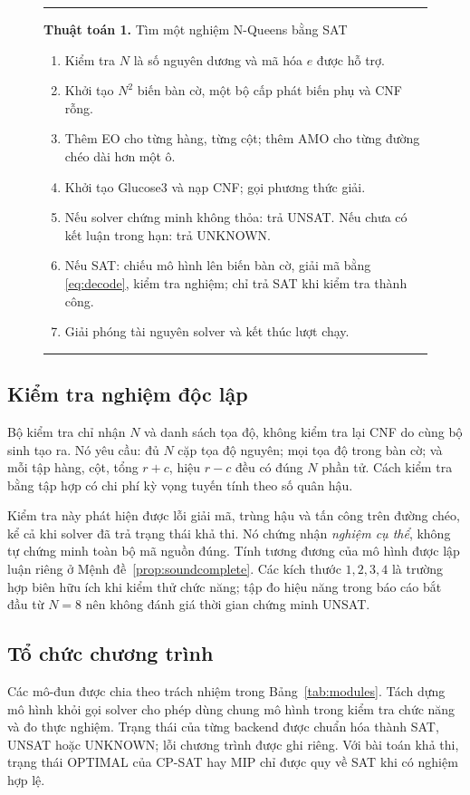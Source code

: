 \documentclass[a4paper,fleqn]{cas-sc}
\newcounter{algorithm}
\begin{document}
\begin{figure}[htbp]
\label{alg:solver}
\centering
\begin{minipage}{0.96\linewidth}
\hrule\vspace{5pt}
\textbf{Thuật toán 1.} Tìm một nghiệm N-Queens bằng SAT
\begin{enumerate}
\item Kiểm tra $N$ là số nguyên dương và mã hóa $e$ được hỗ trợ.
\item Khởi tạo $N^2$ biến bàn cờ, một bộ cấp phát biến phụ và CNF rỗng.
\item Thêm EO cho từng hàng, từng cột; thêm AMO cho từng đường chéo dài hơn một ô.
\item Khởi tạo Glucose3 và nạp CNF; gọi phương thức giải.
\item Nếu solver chứng minh không thỏa: trả UNSAT. Nếu chưa có kết luận trong hạn: trả UNKNOWN.
\item Nếu SAT: chiếu mô hình lên biến bàn cờ, giải mã bằng \eqref{eq:decode}, kiểm tra nghiệm; chỉ trả SAT khi kiểm tra thành công.
\item Giải phóng tài nguyên solver và kết thúc lượt chạy.
\end{enumerate}
\hrule
\end{minipage}
\end{figure}

\subsection{Kiểm tra nghiệm độc lập}
Bộ kiểm tra chỉ nhận $N$ và danh sách tọa độ, không kiểm tra lại CNF do cùng bộ sinh tạo ra. Nó yêu cầu: đủ $N$ cặp tọa độ nguyên; mọi tọa độ trong bàn cờ; và mỗi tập hàng, cột, tổng $r+c$, hiệu $r-c$ đều có đúng $N$ phần tử. Cách kiểm tra bằng tập hợp có chi phí kỳ vọng tuyến tính theo số quân hậu.

Kiểm tra này phát hiện được lỗi giải mã, trùng hậu và tấn công trên đường chéo, kể cả khi solver đã trả trạng thái khả thi. Nó chứng nhận \emph{nghiệm cụ thể}, không tự chứng minh toàn bộ mã nguồn đúng. Tính tương đương của mô hình được lập luận riêng ở Mệnh đề~\ref{prop:soundcomplete}. Các kích thước $1,2,3,4$ là trường hợp biên hữu ích khi kiểm thử chức năng; tập đo hiệu năng trong báo cáo bắt đầu từ $N=8$ nên không đánh giá thời gian chứng minh UNSAT.

\subsection{Tổ chức chương trình}
Các mô-đun được chia theo trách nhiệm trong Bảng~\ref{tab:modules}. Tách dựng mô hình khỏi gọi solver cho phép dùng chung mô hình trong kiểm tra chức năng và đo thực nghiệm. Trạng thái của từng backend được chuẩn hóa thành SAT, UNSAT hoặc UNKNOWN; lỗi chương trình được ghi riêng. Với bài toán khả thi, trạng thái OPTIMAL của CP-SAT hay MIP chỉ được quy về SAT khi có nghiệm hợp lệ.
\end{document}
